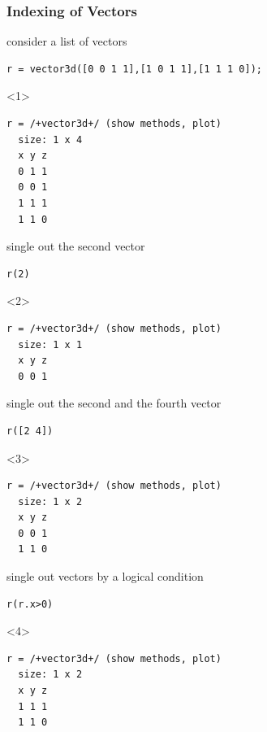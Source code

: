 \documentclass[compress]{beamer}
\begin{document}
\begin{frame}[fragile]
  \frametitle{Indexing of Vectors}

  \begin{overlayarea}{\textwidth}{8cm}

    consider a list of vectors
    \begin{lstlisting}[style=input]
r = vector3d([0 0 1 1],[1 0 1 1],[1 1 1 0]);
    \end{lstlisting}

    \begin{onlyenv}<1>
      \vspace{-.3cm}
      \begin{lstlisting}[style=output]
r = /+vector3d+/ (show methods, plot)
  size: 1 x 4
  x y z
  0 1 1
  0 0 1
  1 1 1
  1 1 0
      \end{lstlisting}
    \end{onlyenv}

    \pause \medskip

    single out the second vector
    \begin{lstlisting}[style=input]
r(2)
    \end{lstlisting}

    \begin{onlyenv}<2>
      \vspace{-0.3cm}
      \begin{lstlisting}[style=output]
r = /+vector3d+/ (show methods, plot)
  size: 1 x 1
  x y z
  0 0 1
      \end{lstlisting}
    \end{onlyenv}

    \pause \medskip

    single out the second and the fourth vector
    \begin{lstlisting}[style=input]
r([2 4])
    \end{lstlisting}
    \begin{onlyenv}<3>
      \vspace{-0.3cm}
      \begin{lstlisting}[style=output]
r = /+vector3d+/ (show methods, plot)
  size: 1 x 2
  x y z
  0 0 1
  1 1 0
      \end{lstlisting}
    \end{onlyenv}

  \pause \medskip

single out vectors by a logical condition
    \begin{lstlisting}[style=input]
r(r.x>0)
    \end{lstlisting}
        \begin{onlyenv}<4>
          \vspace{-0.3cm}
      \begin{lstlisting}[style=output]
r = /+vector3d+/ (show methods, plot)
  size: 1 x 2
  x y z
  1 1 1
  1 1 0
     \end{lstlisting}
    \end{onlyenv}


\end{overlayarea}
\end{frame}
\end{document}

